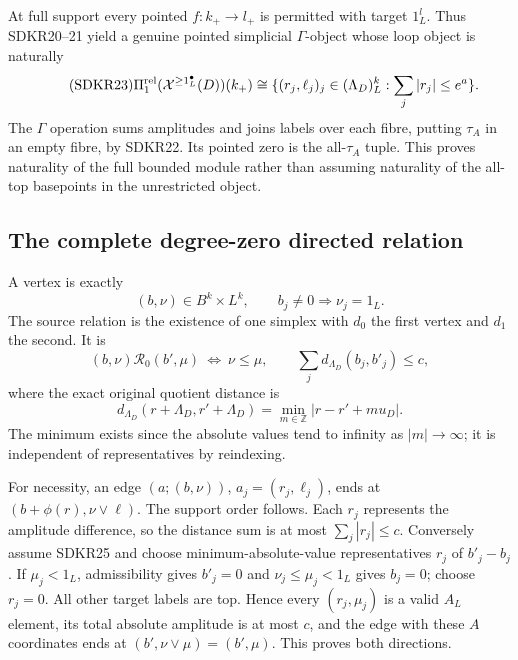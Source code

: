 At full support every pointed $f:k_+\to l_+$ is permitted
with target $1_L^l$. Thus SDKR20--21 yield a genuine pointed
simplicial $\Gamma$-object whose loop object is naturally
\begin{equation}\tag{SDKR23}
\Pi^{\rm rel}_1(\mathcal X^{\ge1_L^\bullet}(D))(k_+)
 \cong
 \{(r_j,\ell_j)_j\in(\Lambda_D)_L^k:
                                  \sum_j|r_j|\le e^a\}.
\end{equation}
The $\Gamma$ operation sums amplitudes and joins labels over
each fibre, putting $\tau_A$ in an empty fibre, by SDKR22.
Its pointed zero is the all-$\tau_A$ tuple. This proves
naturality of the full bounded module rather than assuming
naturality of the all-top basepoints in the unrestricted object.

\subsection{The complete degree-zero directed relation}

A vertex is exactly
\begin{equation}\tag{SDKR24}
(b,\nu)\in B^k\times L^k,\qquad
b_j\ne0\Longrightarrow\nu_j=1_L .
\end{equation}
The source relation is the existence of one simplex with
$d_0$ the first vertex and $d_1$ the second. It is
\begin{equation}\tag{SDKR25}
(b,\nu)\mathcal R_0(b',\mu)
\ \Longleftrightarrow\
\nu\le\mu,\qquad
\sum_jd_{\Lambda_D}(b_j,b'_j)\le c,
\end{equation}
where the exact original quotient distance is
\begin{equation}\tag{SDKR26}
d_{\Lambda_D}(r+\Lambda_D,r'+\Lambda_D)
 =\min_{m\in\mathbb Z}|r-r'+m u_D|.
\end{equation}
The minimum exists since the absolute values tend to
infinity as $|m|\to\infty$; it is independent of representatives
by reindexing.

For necessity, an edge $(a;(b,\nu))$, $a_j=(r_j,\ell_j)$,
ends at $(b+\phi(r),\nu\vee\ell)$. The support order follows.
Each $r_j$ represents the amplitude difference, so the
distance sum is at most $\sum_j|r_j|\le c$.
Conversely assume SDKR25 and choose minimum-absolute-value
representatives $r_j$ of $b'_j-b_j$. If $\mu_j<1_L$,
admissibility gives $b'_j=0$ and
$\nu_j\le\mu_j<1_L$ gives $b_j=0$; choose $r_j=0$.
All other target labels are top. Hence every
$(r_j,\mu_j)$ is a valid $A_L$ element, its total absolute
amplitude is at most $c$, and the edge with these $A$
coordinates ends at $(b',\nu\vee\mu)=(b',\mu)$.
This proves both directions.

